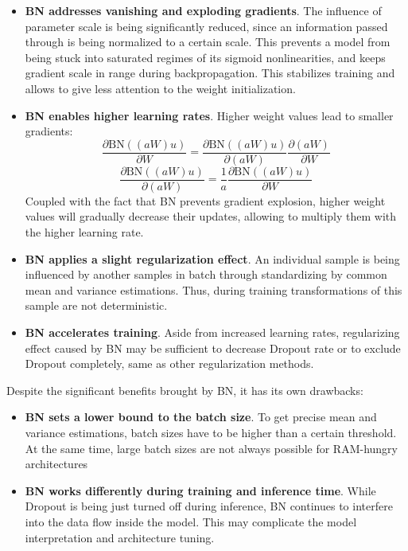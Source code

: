 \documentclass[thesis=B,english]{FITthesis}[2019/12/23]
\begin{document}
\begin{itemize}
	\item \textbf{BN addresses vanishing and exploding gradients}. The influence of parameter scale is being significantly reduced, since an information passed through is being normalized to a certain scale. This prevents a model from being stuck into saturated regimes of its sigmoid nonlinearities, and keeps gradient scale in range during backpropagation. This stabilizes training and allows to give less attention to the weight initialization.
	\item \textbf{BN enables higher learning rates}. Higher weight values lead to smaller gradients:
	\[\frac{ \partial \text{BN}((aW)u)}{\partial W} = \frac{\partial \text{BN}((aW)u)}{\partial (aW)}\frac{\partial (aW)}{\partial W}\]
	\[\frac{\partial \text{BN}((aW)u)}{\partial(aW)} = \frac{1}{a}\frac{\partial \text{BN}((aW)u)}{\partial W}\]
	Coupled with the fact that BN prevents gradient explosion, higher weight values will gradually decrease their updates, allowing to multiply them with the higher learning rate.
	
	\item \textbf{BN applies a slight regularization effect}. An individual sample is being influenced by another samples in batch through standardizing by common mean and variance estimations. Thus, during training transformations of this sample are not deterministic.
	
	\item \textbf{BN accelerates training}. Aside from increased learning rates, regularizing effect caused by BN may be sufficient to decrease Dropout rate or to exclude Dropout completely, same as other regularization methods.
	
\end{itemize}
Despite the significant benefits brought by BN, it has its own drawbacks:
\begin{itemize}
	\item \textbf{BN sets a lower bound to the batch size}. To get precise mean and variance estimations, batch sizes have to be higher than a certain threshold. At the same time, large batch sizes are not always possible for RAM-hungry architectures
	\item \textbf{BN works differently during training and inference time}. While Dropout is being just turned off during inference, BN continues to interfere into the data flow inside the model. This may complicate the model interpretation and architecture tuning.
\end{itemize}
\end{document}

